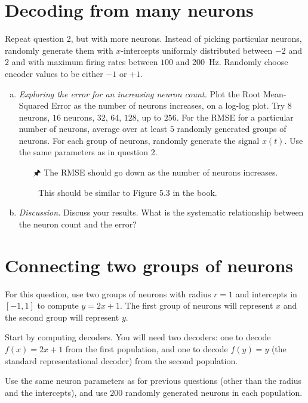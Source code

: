 	\newpage
	
	\section{Decoding from many neurons}
	
	Repeat question 2, but with more neurons. Instead of picking particular neurons, randomly generate them with $x$-intercepts uniformly distributed between $-2$ and $2$ and with maximum firing rates between $100$ and \SI{200}{\hertz}. Randomly choose encoder values to be either $-1$ or $+1$.

	\begin{enumerate}[a)]
		\item {} \emph{Exploring the error for an increasing neuron count.} Plot the Root Mean-Squared Error as the number of neurons increases, on a log-log plot. Try $8$ neurons, $16$ neurons, $32$, $64$, $128$, up to $256$. For the RMSE for a particular number of neurons, average over at least $5$ randomly generated groups of neurons. For each group of neurons, randomly generate the signal $x(t)$. Use the same parameters as in question 2.
		\begin{itemize}
			\item[\symbolfont 🖈] The RMSE should go down as the number of neurons increases.
			\item[\symbolfont  📖] This should be similar to Figure 5.3 in the book.
		\end{itemize}
		\item {} \emph{Discussion.} Discuss your results. What is the systematic relationship between the neuron count and the error?
	\end{enumerate}

	\section{Connecting two groups of neurons}
		
	For this question, use two groups of neurons with radius $r = 1$ and intercepts in $[-1, 1]$ to compute $y = 2x+1$. The first group of neurons will represent $x$ and the second group will represent $y$.
	
	Start by computing decoders. You will need two decoders: one to decode $f(x)=2x+1$ from the first population, and one to decode $f(y)=y$ (the standard representational decoder) from the second population.
	
	Use the same neuron parameters as for previous questions (other than the radius and the intercepts), and use $200$ randomly generated neurons in each population.

